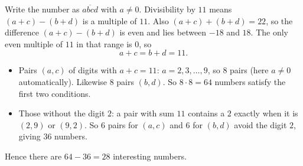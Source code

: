 Write the number as $\overline{abcd}$ with $a\ne0$. Divisibility by $11$ means $(a+c)-(b+d)$ is a multiple of $11$. Also $(a+c)+(b+d)=22$, so the difference $(a+c)-(b+d)$ is even and lies between $-18$ and $18$. The only even multiple of $11$ in that range is $0$, so
\[a+c=b+d=11.\]
\begin{itemize}
\item Pairs $(a,c)$ of digits with $a+c=11$: $a=2,3,\dots,9$, so $8$ pairs (here $a\ne0$ automatically). Likewise $8$ pairs $(b,d)$. So $8\cdot8=64$ numbers satisfy the first two conditions.
\item Those without the digit $2$: a pair with sum $11$ contains a $2$ exactly when it is $(2,9)$ or $(9,2)$. So $6$ pairs for $(a,c)$ and $6$ for $(b,d)$ avoid the digit $2$, giving $36$ numbers.
\end{itemize}
Hence there are $64-36=\boxed{28}$ interesting numbers.
